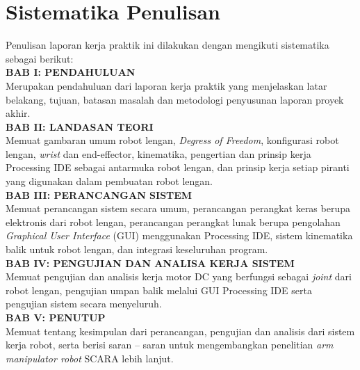 \section{Sistematika Penulisan}
Penulisan laporan kerja praktik ini dilakukan dengan mengikuti sistematika sebagai berikut:\\
\noindent
\textbf{BAB I\hspace*{0.6cm}: PENDAHULUAN}\\
\noindent
Merupakan pendahuluan dari laporan kerja praktik yang menjelaskan latar belakang, tujuan, batasan masalah dan metodologi penyusunan laporan proyek akhir.\\
\noindent
\textbf{BAB II\hspace*{0.5cm}: LANDASAN TEORI}\\
\noindent
Memuat gambaran umum robot lengan, \emph {Degress of Freedom}, konfigurasi robot lengan, \emph{wrist} dan end-effector, kinematika, pengertian dan prinsip kerja Processing IDE sebagai antarmuka robot lengan, dan prinsip kerja setiap piranti yang digunakan dalam pembuatan robot lengan. \\
\textbf{BAB III\hspace*{0.375cm}:  PERANCANGAN SISTEM}\\
\noindent
Memuat perancangan sistem secara umum, perancangan perangkat keras berupa elektronis dari robot lengan, perancangan perangkat lunak berupa pengolahan \textit{Graphical User Interface} (GUI) menggunakan Processing IDE, sistem kinematika balik untuk robot lengan, dan integrasi keseluruhan program. \\
\textbf{BAB IV\hspace*{0.4cm}:  PENGUJIAN DAN ANALISA KERJA SISTEM }\\
\noindent
Memuat pengujian dan analisis kerja motor DC yang berfungsi sebagai \emph {joint} dari robot lengan, pengujian umpan balik melalui GUI Processing IDE serta pengujian sistem secara menyeluruh.\\
\textbf{BAB V\hspace*{0.6cm}: PENUTUP}\\
Memuat tentang kesimpulan dari perancangan, pengujian dan analisis dari sistem kerja robot, serta berisi saran – saran untuk mengembangkan penelitian \emph{ arm manipulator robot} SCARA lebih lanjut. \\